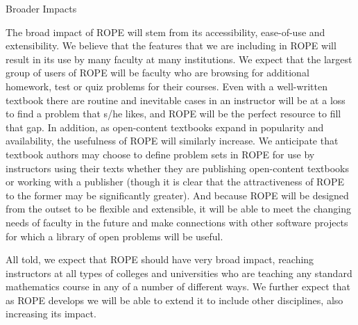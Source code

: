 \documentclass[11pt]{article}
\begin{document}
\begin{section}{Broader Impacts}

The broad impact of ROPE will stem from its accessibility, ease-of-use
and extensibility.  We believe that the features that we are including in
ROPE will result in its use by many faculty at many institutions.  We
expect that the largest group of users of ROPE will be faculty who are
browsing for additional homework, test or quiz problems for their courses.
Even with a well-written textbook there are routine and inevitable cases
in an instructor will be at a loss to find a problem that s/he likes, and
ROPE will be the perfect resource to fill that gap.  In addition, as
open-content textbooks expand in popularity and availability, the
usefulness of ROPE will similarly increase.  We anticipate that
textbook authors may choose to define problem sets in ROPE for use by
instructors using their texts whether they are publishing open-content
textbooks or working with a publisher (though it is clear that the
attractiveness of ROPE to the former may be significantly greater).
And because ROPE will be designed from the outset to be flexible and
extensible, it will be able to meet the changing needs of faculty in the
future and make connections with other software projects for which a
library of open problems will be useful.

All told, we expect that ROPE should have very broad impact, reaching
instructors at all types of colleges and universities who are teaching any
standard mathematics course in any of a number of different ways.  We
further expect that as ROPE develops we will be able to extend it to
include other disciplines, also increasing its impact.

\end{section}
\end{document}
